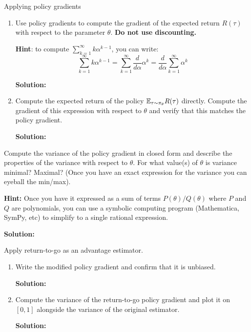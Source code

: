\documentclass{article}
\begin{document}
\begin{enumerate}
 Applying policy gradients
\begin{enumerate}
    \item Use policy gradients to compute the gradient of the expected return $R(\tau)$ with respect to the parameter $\theta$. \textbf{Do not use discounting.}

    \textbf{Hint}: to compute $\sum_{k=1}^\infty k\alpha^{k-1}$, you can write:
    \[\sum_{k=1}^\infty k\alpha^{k-1} = \sum_{k=1}^\infty \frac{d}{d\alpha}\alpha^k = \frac{d}{d\alpha}\sum_{k=1}^\infty\alpha^k\]

\textbf{Solution:}

    \item \label{exact_gradient} Compute the expected return of the policy $\mathbb{E}_{\tau \sim \pi_\theta} R(\tau)$ directly. Compute the gradient of this expression with respect to $\theta$ and verify that this matches the policy gradient.

\textbf{Solution:}

\end{enumerate}
\newpage
{} Compute the variance of the policy gradient in closed form and describe the properties of the variance with respect to $\theta$. For what value(s) of $\theta$ is variance minimal? Maximal? (Once you have an exact expression for the variance you can eyeball the min/max).

\textbf{Hint:}  Once you have it expressed as a sum of terms $P(\theta)/Q(\theta)$ where $P$ and $Q$ are polynomials, you can use a symbolic computing program (Mathematica, SymPy, etc) to simplify to a single rational expression.

\textbf{Solution:}

\newpage
{} Apply return-to-go as an advantage estimator.
\begin{enumerate}
    \item Write the modified policy gradient and confirm that it is unbiased.

\textbf{Solution:}

    \item Compute the variance of the return-to-go policy gradient and plot it on $[0, 1]$ alongside the variance of the original estimator.

\textbf{Solution:}


\end{enumerate}
\end{enumerate}
\end{document}
